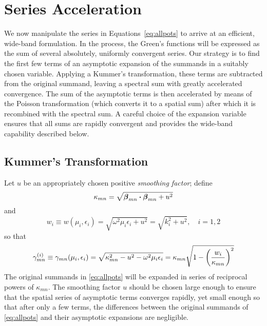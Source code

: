 \section{Series Acceleration}
  We now manipulate the series in Equations~\eqref{eq:allpots} to
  arrive at an efficient, 
wide-band formulation.  In the process, the Green's functions will be
expressed as the sum of several absolutely, uniformly convergent
series.  Our strategy is to find the first few terms of an asymptotic
expansion of the summands in a suitably chosen variable.  Applying a Kummer's
transformation, these terms are
subtracted from the original summand, leaving a spectral sum with greatly
accelerated convergence.  The sum of the asymptotic terms is then
accelerated by means of the Poisson transformation (which converts it to a
spatial sum) after which it is recombined
with the spectral sum.  A careful choice of the expansion variable ensures
that all sums are rapidly convergent and  provides
the wide-band capability described below.

\subsection{Kummer's Transformation}
Let $u$ 
be an appropriately chosen positive {\em smoothing factor}; define
\begin{equation}
  \kappa_{mn}  =  \sqrt{\boldsymbol{\beta}_{mn} \boldsymbol{\cdot} \boldsymbol{\beta}_{mn} +u^2}
         \label{eq:kappa}
\end{equation}
and
\begin{equation}
  w_i  \equiv w(\mu_i,\epsilon_i) =  
  \sqrt{\omega^2\mu_i\epsilon_i + u^2} =
  \sqrt{k_i^2+u^2}, \quad i=1,2 \label{eq:w}
\end{equation}
so that 
\begin{equation}
  \gamma^{(i)}_{mn} 
  \equiv \gamma_{mn} (\mu_i,\epsilon_i)
  = \sqrt{\kappa_{mn}^2 - u^2 - \omega^2\mu_i\epsilon_i}
  = \kappa_{mn} \sqrt{1 - \left(\frac{w_i}{\kappa_{mn}}\right)^2}
\end{equation}
The original summands in \eqref{eq:allpots} will be expanded in series of reciprocal 
powers
of $\kappa_{mn}$.  The smoothing factor $u$ should be chosen large enough to ensure that the 
spatial series of asymptotic terms converges rapidly, yet small
enough so that after only a few terms, the differences between the original summands
of \eqref{eq:allpots} and their asymptotic expansions are negligible. 

